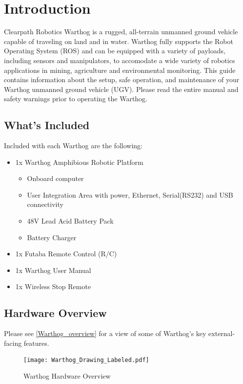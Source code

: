 \documentclass[]{clearpath-latex/clearpath-manual}
\begin{document}
\tableofcontents

\section{Introduction}
Clearpath Robotics Warthog is a rugged, all-terrain unmanned ground vehicle capable of traveling on land and in water.  Warthog fully supports the Robot Operating System (ROS) and can be equipped with a variety of payloads, including sensors and manipulators, to accomodate a wide variety of robotics applications in mining, agriculture and environmental monitoring. This guide contains information about the setup, safe operation, and maintenance of your Warthog unmanned ground vehicle (UGV).  Please read the entire manual and safety warnings prior to operating the Warthog.

\subsection{What's Included}

Included with each Warthog are the following:

\begin{itemize}[nolistsep]
  \item 1x Warthog Amphibious Robotic Platform
  \begin{itemize}
    \item{Onboard computer}
    \item{User Integration Area with power, Ethernet, Serial(RS232) and USB connectivity}
    \item{48V Lead Acid Battery Pack}
    \item{Battery Charger}
  \end{itemize}
  \item 1x Futaba Remote Control (R/C)
  \item 1x Warthog User Manual
  \item 1x Wireless Stop Remote
\end{itemize}



\pagebreak[4]
\subsection{Hardware Overview}

Please see \autoref{Warthog_overview} for a view of some of Warthog's key external-facing features.

\begin{figure}[h]
  \centering
  \texttt{[image: Warthog\_Drawing\_Labeled.pdf]}
  \caption{Warthog Hardware Overview}
  \label{Warthog_overview}
\end{figure}
\end{document}
